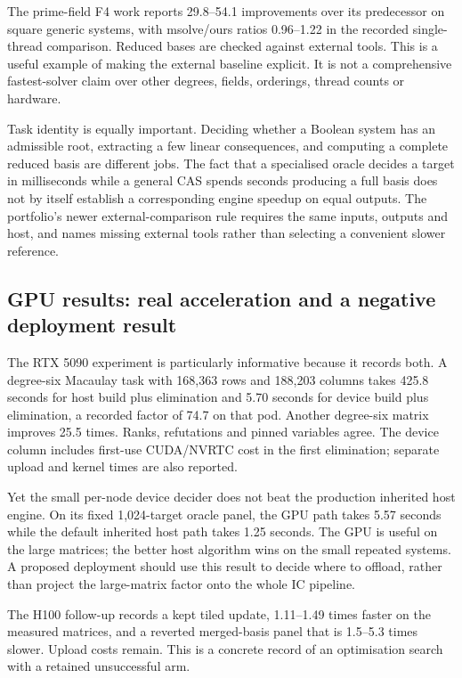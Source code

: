 The prime-field F4 work reports 29.8--54.1 improvements over its
predecessor on square generic systems, with msolve/ours ratios
0.96--1.22 in the recorded single-thread comparison. Reduced bases are
checked against external tools. This is a useful example of making the
external baseline explicit. It is not a comprehensive fastest-solver
claim over other degrees, fields, orderings, thread counts or hardware.

Task identity is equally important. Deciding whether a Boolean system
has an admissible root, extracting a few linear consequences, and
computing a complete reduced basis are different jobs. The fact that a
specialised oracle decides a target in milliseconds while a general CAS
spends seconds producing a full basis does not by itself establish a
corresponding engine speedup on equal outputs. The portfolio's newer
external-comparison rule requires the same inputs, outputs and host,
and names missing external tools rather than selecting a convenient
slower reference.

\subsection{GPU results: real acceleration and a negative deployment result}

The RTX 5090 experiment is particularly informative because it records
both. A degree-six Macaulay task with 168,363 rows and 188,203 columns
takes 425.8 seconds for host build plus elimination and 5.70 seconds for
device build plus elimination, a recorded factor of 74.7 on that pod.
Another degree-six matrix improves 25.5 times. Ranks, refutations and
pinned variables agree. The device column includes first-use CUDA/NVRTC
cost in the first elimination; separate upload and kernel times are also
reported.

Yet the small per-node device decider does not beat the production
inherited host engine. On its fixed 1,024-target oracle panel, the GPU
path takes 5.57 seconds while the default inherited host path takes
1.25 seconds. The GPU is useful on the large matrices; the better host
algorithm wins on the small repeated systems. A proposed deployment
should use this result to decide where to offload, rather than project
the large-matrix factor onto the whole IC pipeline.

The H100 follow-up records a kept tiled update, 1.11--1.49 times faster
on the measured matrices, and a reverted merged-basis panel that is
1.5--5.3 times slower. Upload costs remain. This is a concrete record of
an optimisation search with a retained unsuccessful arm.

